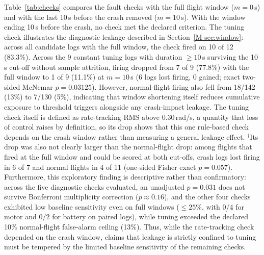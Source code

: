 \documentclass[preprint,12pt]{elsarticle}
\begin{document}
Table~\ref{tab:checks} compares the fault checks with the full flight window ($m=0$\,s) and with the last 10\,s before
the crash removed ($m=10$\,s). With the window ending 10\,s before the crash, no check met the declared criterion.
The tuning check illustrates the diagnostic leakage described in Section~\ref{M-sec:window}: across all candidate logs with the full
window, the check fired on 10 of 12 (83.3\%). Across the 9 constant tuning logs with duration $\ge 10$\,s surviving the 10\,s
cut-off without sample attrition, firing dropped from 7 of 9 (77.8\%) with the full window to 1 of 9 (11.1\%) at $m=10$\,s
(6 logs lost firing, 0 gained; exact two-sided McNemar $p=0.03125$). However, normal-flight firing also fell from 18/142 (13\%)
to 7/130 (5\%), indicating that window shortening itself reduces cumulative exposure to threshold triggers alongside any crash-impact
leakage. The tuning check itself is defined as rate-tracking RMS above 0.30\,rad/s, a quantity that loss of control raises by definition, so its drop shows that this one rule-based check depends on the crash window rather than measuring a general leakage effect. $^\dagger$Its drop was also not clearly larger than the normal-flight drop: among flights that fired at the full window and could be scored at both cut-offs, crash logs lost firing in 6 of 7 and normal flights in 4 of 11 (one-sided Fisher exact $p=0.057$). Furthermore, this exploratory finding is descriptive rather than confirmatory: across the five diagnostic checks evaluated,
an unadjusted $p=0.031$ does not survive Bonferroni multiplicity correction ($p \approx 0.16$), and the other four checks exhibited
low baseline sensitivity even on full windows ($\le 25\%$, with 0/4 for motor and 0/2 for battery on paired logs), while tuning exceeded
the declared 10\% normal-flight false-alarm ceiling (13\%). Thus, while the rate-tracking check depended on the crash window, claims that
leakage is strictly confined to tuning must be tempered by the limited baseline sensitivity of the remaining checks.
\end{document}
